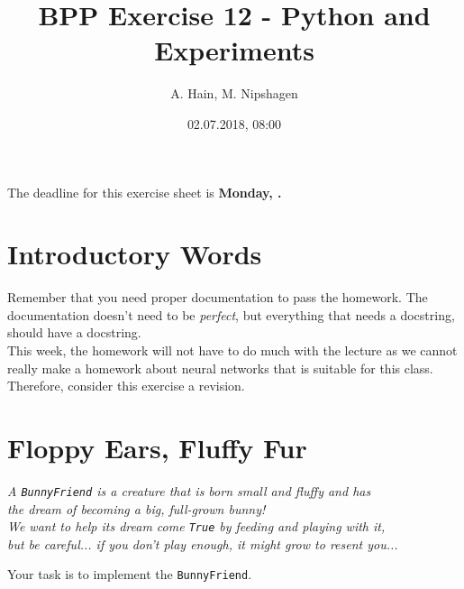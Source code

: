 
\usepackage{setspace}

\title{BPP Exercise 12 - Python and Experiments}
\author{A. Hain, M. Nipshagen}
\date{02.07.2018, 08:00}


\makeatletter
\let\thetitle\@title
\let\theauthor\@author
\let\thedate\@date
\makeatother


\newcommand\itemsub[1]{
	\begin{itemize}
		\item #1
	\end{itemize}
}





The deadline for this exercise sheet is \textbf{Monday, \thedate.}

\section*{Introductory Words}
Remember that you need proper documentation to pass
the homework. The documentation doesn't need to be \textit{perfect}, but
everything that needs a docstring, should have a docstring.\\

\noindent This week, the homework will not have to do much with the lecture as
we cannot really make a homework about neural networks that is suitable for this
class. Therefore, consider this exercise a revision.

\section{Floppy Ears, Fluffy Fur}
\begin{center}\textit{A \texttt{BunnyFriend} is a creature that is born small and fluffy
and has\\ the dream of becoming a big, full-grown bunny!\\
We want to help its dream come \texttt{True}
by feeding and playing with it,\\ but be careful...
if you don't play enough, it
might grow to resent you...}
\newline
\end{center}
\noindent Your task is to implement the \texttt{BunnyFriend}.

